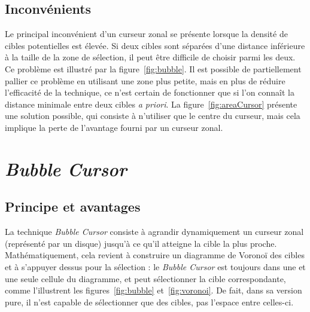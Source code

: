 	\subsection{Inconvénients}
	Le principal inconvénient d'un curseur zonal se présente lorsque la densité de cibles potentielles est élevée. Si deux cibles sont séparées d'une distance inférieure à la taille de la zone de sélection, il peut être difficile de choisir parmi les deux. Ce problème est illustré par la figure~\ref{fig:bubble}. Il est possible de partiellement pallier ce problème en utilisant une zone plus petite, mais en plus de réduire l'efficacité de la technique, ce n'est certain de fonctionner que si l'on connaît la distance minimale entre deux cibles \emph{a priori}. La figure~\ref{fig:areaCursor} présente une solution possible, qui consiste à n'utiliser que le centre du curseur, mais cela implique la perte de l'avantage fourni par un curseur zonal.

\section{\emph{Bubble Cursor}}
	\subsection{Principe et avantages}
	La technique \emph{Bubble Cursor} consiste à agrandir dynamiquement un curseur zonal (représenté par un disque) jusqu'à ce qu'il atteigne la cible la plus proche. Mathématiquement, cela revient à construire un diagramme de Voronoï des cibles et à s'appuyer dessus pour la sélection : le \emph{Bubble Cursor} est toujours dans une et une seule cellule du diagramme, et peut sélectionner la cible correspondante, comme l'illustrent les figures~\ref{fig:bubble} et~\ref{fig:voronoi}. De fait, dans sa version pure, il n'est capable de sélectionner que des cibles, pas l'espace entre celles-ci.	

